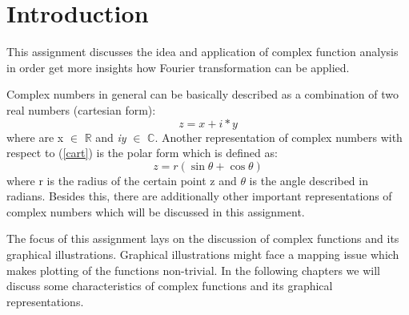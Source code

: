 \documentclass[a4paper,11pt]{article}
\begin{document}
\newpage                %

\listoffigures
\newpage


\tableofcontents

\newpage
{}      %
\setcounter{page}{1}        %
\section{Introduction}
This assignment discusses the idea and application of complex function analysis in order get more insights how Fourier transformation can be applied.

Complex numbers in general can be basically described as a combination of two real numbers (cartesian form):
\begin{equation}
z=x+i*y
\label{cart}
\end{equation}
where are x $\in$ $\mathbb{R}$ and \textit{iy} $\in$ $\mathbb{C}$.
Another representation of complex numbers with respect to (\ref{cart}) is the polar form which is defined as:
\begin{equation}
z=r(\sin \theta + \cos \theta)
\label{polar}
\end{equation}
where r is the radius of the certain point z and $\theta$ is the angle described in radians. Besides this, there are additionally other important representations of complex numbers which will be discussed in this assignment.

The focus of this assignment lays on the discussion of complex functions and its graphical illustrations. Graphical illustrations might face a mapping issue which makes plotting of the functions non-trivial. In the following chapters we will discuss some characteristics of complex functions and its graphical representations.
\end{document}
